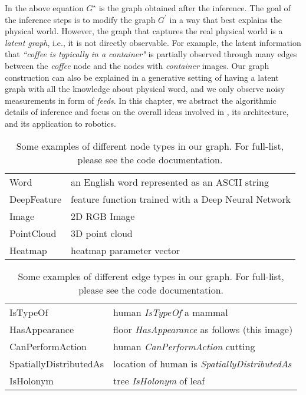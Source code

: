 In the above equation $G^\star$ is the graph obtained after the inference. The goal of the inference steps is to modify the graph $G^\prime$ in a way that best explains the physical world. However, the graph that captures the real physical world is a  \textit{latent graph}, i.e., it is not directly observable.
For  example, the latent information that \emph{``coffee is typically in a container"} is partially observed through
many edges between the \emph{coffee} node and the nodes with \emph{container} images. Our graph construction can also be explained in a generative setting of having a latent graph with all the knowledge about physical word, and we only observe  noisy measurements in form of \textit{feeds}. In this chapter, we abstract the algorithmic details of inference and focus on the overall ideas involved in \robobrain{}, its architecture, and its application to robotics.



\begin{table}
\caption{Some examples of different node types in our \robobrain{} graph. For full-list,
please see the code documentation.}
\label{tbl:vertices}
\begin{tabular}{ll}
Word & an English word represented as an ASCII string\\
DeepFeature & feature function trained with a Deep Neural Network\\
Image & 2D RGB Image\\
PointCloud & 3D point cloud\\
Heatmap & heatmap parameter vector\\
\end{tabular}
\end{table}
\begin{table}
\caption{Some examples of different edge types in our \robobrain{} graph. For full-list,
please see the code documentation.}
\label{tbl:edges}
\begin{tabular}{ll}
IsTypeOf & human \emph{IsTypeOf} a mammal \\
HasAppearance & floor \emph{HasAppearance} as follows (this image) \\
CanPerformAction & human \emph{CanPerformAction} cutting \\
SpatiallyDistributedAs & location of human is \emph{SpatiallyDistributedAs} \\
IsHolonym & tree  \emph{IsHolonym} of leaf
\end{tabular}
\end{table}
